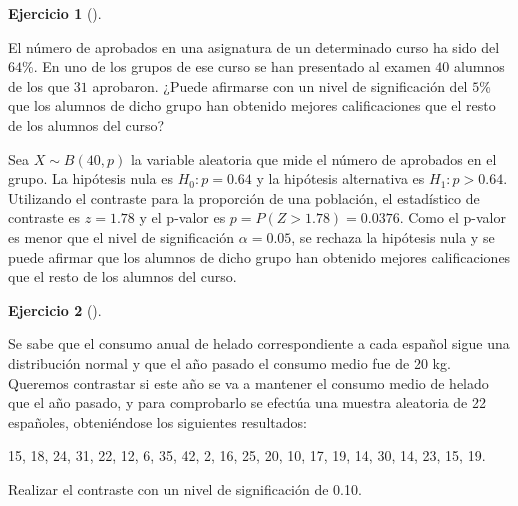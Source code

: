 \documentclass[
  spanish,
  a4paper,
]{scrreport}
\theoremstyle{definition}
\newtheorem{exercise}{Ejercicio}[chapter]
\theoremstyle{remark}
\begin{document}
\begin{exercise}[]\protect\hypertarget{exr-contraste-proporcion-aprobados}{}\label{exr-contraste-proporcion-aprobados}

El número de aprobados en una asignatura de un determinado curso ha sido
del \(64\)\%. En uno de los grupos de ese curso se han presentado al
examen \(40\) alumnos de los que \(31\) aprobaron. ¿Puede afirmarse con
un nivel de significación del \(5\)\% que los alumnos de dicho grupo han
obtenido mejores calificaciones que el resto de los alumnos del curso?

\end{exercise}

\begin{tcolorbox}[enhanced jigsaw, arc=.35mm, bottomrule=.15mm, bottomtitle=1mm, breakable, colback=white, colbacktitle=quarto-callout-tip-color!10!white, colframe=quarto-callout-tip-color-frame, coltitle=black, left=2mm, leftrule=.75mm, opacityback=0, opacitybacktitle=0.6, rightrule=.15mm, title=\textcolor{quarto-callout-tip-color}{\faLightbulb}\hspace{0.5em}{Solución}, titlerule=0mm, toprule=.15mm, toptitle=1mm]

Sea \(X\sim B(40,p)\) la variable aleatoria que mide el número de
aprobados en el grupo. La hipótesis nula es \(H_0: p=0.64\) y la
hipótesis alternativa es \(H_1: p> 0.64\). Utilizando el contraste para
la proporción de una población, el estadístico de contraste es
\(z=1.78\) y el p-valor es \(p = P(Z>1.78) = 0.0376\). Como el p-valor
es menor que el nivel de significación \(\alpha = 0.05\), se rechaza la
hipótesis nula y se puede afirmar que los alumnos de dicho grupo han
obtenido mejores calificaciones que el resto de los alumnos del curso.

\end{tcolorbox}

\begin{exercise}[]\protect\hypertarget{exr-contraste-media-consumo}{}\label{exr-contraste-media-consumo}

Se sabe que el consumo anual de helado correspondiente a cada español
sigue una distribución normal y que el año pasado el consumo medio fue
de 20 kg. Queremos contrastar si este año se va a mantener el consumo
medio de helado que el año pasado, y para comprobarlo se efectúa una
muestra aleatoria de 22 españoles, obteniéndose los siguientes
resultados:

15, 18, 24, 31, 22, 12, 6, 35, 42, 2, 16, 25, 20, 10, 17, 19, 14, 30,
14, 23, 15, 19.

Realizar el contraste con un nivel de significación de 0.10.

\end{exercise}
\end{document}
